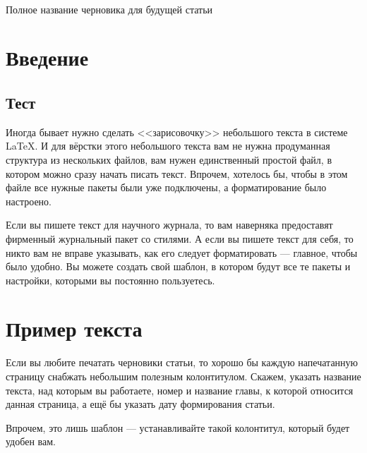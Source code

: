 \documentclass[a4paper,12pt]{article}
\begin{document}
{~}\bigskip
\begin{center}
\Huge{Полное название черновика для будущей статьи}
\end{center}

\section{Введение}
\subsection{Тест}
Иногда бывает нужно сделать <<зарисовочку>> небольшого текста в системе \LaTeX. И для вёрстки этого небольшого текста вам не нужна продуманная структура из нескольких файлов, вам нужен единственный простой файл, в котором можно сразу начать писать текст. Впрочем, хотелось бы, чтобы в этом файле все нужные пакеты были уже подключены, а форматирование было настроено. 

Если вы пишете текст для научного журнала, то вам наверняка предоставят фирменный журнальный пакет со стилями. А если вы пишете текст для себя, то никто вам не вправе указывать, как его следует форматировать --- главное, чтобы было удобно. Вы можете создать свой шаблон, в котором будут все те пакеты и настройки, которыми вы постоянно пользуетесь.

\clearpage
\section{Пример текста}
Если вы любите печатать черновики статьи, то хорошо бы каждую напечатанную страницу снабжать небольшим полезным колонтитулом. Скажем, указать название текста, над которым вы работаете, номер и название главы, к которой относится данная страница, а ещё бы указать дату формирования статьи.

Впрочем, это лишь шаблон --- устанавливайте такой колонтитул, который будет удобен вам.
\end{document}
